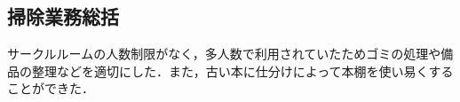 \subsection*{掃除業務総括}

サークルルームの人数制限がなく，多人数で利用されていたためゴミの処理や備品の整理などを適切にした．また，古い本に仕分けによって本棚を使い易くすることができた．

